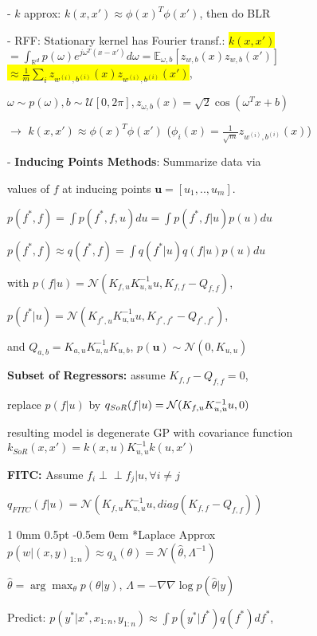 \documentclass[11pt,landscape,a4paper,fleqn]{article}
\makeatletter
\newcommand*{\rsection}{%
	\@startsection{section}%
	{1}%
	{0mm}%
	{0.5pt}%
	{-0.5em \@plus 0em}
	{\color{myorange}\sffamily\small\bfseries}}
\newcommand{\mhl}[1]{\setlength{\fboxsep}{0pt}\colorbox{yellow}{#1}}
\newcommand{\indep}{\perp\!\!\!\perp}
\makeatother
\begin{document}
\begin{multicols*}{4}
- $k$ approx: $k(x,x') \approx \phi(x)^T \phi(x')$, then do BLR

- RFF: Stationary kernel has Fourier transf.:  \mhl{$k(x,x')$} $= \int_{\mathbb{R}^d} p(\omega) e^{j \omega^T (x - x')} d\omega = \mathbb{E}_{\omega, b}[z_{w,b}(x) z_{w,b}(x')]$ \mhl{$\approx \frac{1}{m} \sum_i z_{w^{(i)},b^{(i)}}(x) z_{w^{(i)},b^{(i)}}(x')$},

$\omega \sim p(\omega), b \sim \mathcal{U}[0, 2\pi], z_{\omega, b}(x) = \sqrt{2} \cos(\omega^T x + b)$



$\rightarrow$ $k(x,x') \approx \phi(x)^T \phi(x')$ ($\phi_i(x) = \frac{1}{\sqrt{m}} z_{w^{(i)},b^{(i)}}(x)$)

- {\fontsize{9.5}{6}\selectfont \textbf{Inducing Points Methods}}: Summarize data via

values of $f$ at inducing points $\mathbf{u} = [u_1,..,u_m]$.

$p(f^*, f) = \int p(f^*, f, u) du = \int p(f^*, f | u) p(u) du$

$p(f^*, f) \approx q(f^*, f) = \int q(f^* | u) q(f | u) p(u) du$

with $p(f | u) = \mathcal{N}(K_{f,u} K_{u,u}^{-1} u, K_{f,f} - Q_{f,f} )$,

$p(f^* | u) = \mathcal{N}(K_{f^*,u} K_{u,u}^{-1} u, K_{f^*, f^*} - Q_{f^*, f^*})$,

and $Q_{a,b} = K_{a,u} K_{u,u}^{-1} K_{u,b}$, $p(\mathbf{u}) \sim \mathcal{N}(0, K_{u,u})$

\textbf{Subset of Regressors:} assume $K_{f,f} - Q_{f,f} = 0$,

replace $p(f|u)$ by $q_{\tiny SoR}(f|u) = \mathcal{N}(K_{f,u} K_{u,u}^{-1} u,0)$

resulting model is degenerate GP with covariance function $k_{SoR}(x,x') = k(x,u) K_{u,u}^{-1} k(u, x')$

\textbf{FITC:} Assume $f_i \indep f_j | u, \forall i \neq j$

\vspace*{-1mm}
$q_{FITC}(f | u) = \mathcal{N}(K_{f,u} K_{u,u}^{-1} u, diag(K_{f,f} - Q_{f,f}))$

\rsection*{Laplace Approx} \mbox{\fontsize{9.5}{6}\selectfont $p(w|(x,y)_{1:n}) \approx q_\lambda(\theta) = \mathcal{N}(\hat{\theta}, \Lambda^{-1})$}

$\hat{\theta} = \arg\max_\theta p(\theta | y)$, $\Lambda = - \nabla\nabla \log p(\hat{\theta} | y)$

Predict: $p(y^*| x^*, x_{1:n}, y_{1:n}) \approx \int p(y^* | f^*) q(f^*) df^*$,


\end{multicols*}
\end{document}

